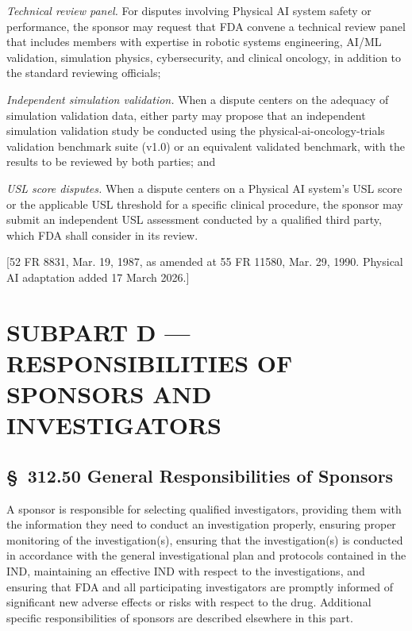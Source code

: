 \documentclass[11pt]{article}
\begin{document}
\begin{description}[leftmargin=0.8cm,style=sameline]
\item[(i)] \textit{Technical review panel.} For disputes involving Physical AI system safety or performance, the sponsor may request that FDA convene a technical review panel that includes members with expertise in robotic systems engineering, AI/ML validation, simulation physics, cybersecurity, and clinical oncology, in addition to the standard reviewing officials;
\item[(ii)] \textit{Independent simulation validation.} When a dispute centers on the adequacy of simulation validation data, either party may propose that an independent simulation validation study be conducted using the physical-ai-oncology-trials validation benchmark suite (v1.0) or an equivalent validated benchmark, with the results to be reviewed by both parties; and
\item[(iii)] \textit{USL score disputes.} When a dispute centers on a Physical AI system's USL score or the applicable USL threshold for a specific clinical procedure, the sponsor may submit an independent USL assessment conducted by a qualified third party, which FDA shall consider in its review.
\end{description}

[52 FR 8831, Mar. 19, 1987, as amended at 55 FR 11580, Mar. 29, 1990. Physical AI adaptation added 17 March 2026.]

\clearpage

\section{SUBPART D --- RESPONSIBILITIES OF SPONSORS AND INVESTIGATORS}

\subsection{\S~312.50 General Responsibilities of Sponsors}

A sponsor is responsible for selecting qualified investigators, providing them with the information they need to conduct an investigation properly, ensuring proper monitoring of the investigation(s), ensuring that the investigation(s) is conducted in accordance with the general investigational plan and protocols contained in the IND, maintaining an effective IND with respect to the investigations, and ensuring that FDA and all participating investigators are promptly informed of significant new adverse effects or risks with respect to the drug. Additional specific responsibilities of sponsors are described elsewhere in this part.
\end{document}
